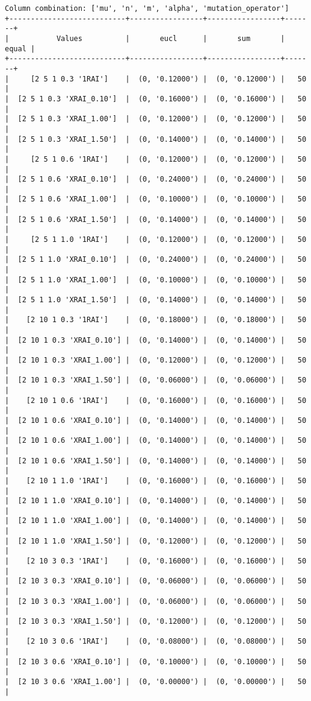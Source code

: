 \documentclass{article}
\begin{document}
\begin{verbatim}
Column combination: ['mu', 'n', 'm', 'alpha', 'mutation_operator']
+---------------------------+-----------------+-----------------+-------+
|           Values          |       eucl      |       sum       | equal |
+---------------------------+-----------------+-----------------+-------+
|     [2 5 1 0.3 '1RAI']    |  (0, '0.12000') |  (0, '0.12000') |   50  |
|  [2 5 1 0.3 'XRAI_0.10']  |  (0, '0.16000') |  (0, '0.16000') |   50  |
|  [2 5 1 0.3 'XRAI_1.00']  |  (0, '0.12000') |  (0, '0.12000') |   50  |
|  [2 5 1 0.3 'XRAI_1.50']  |  (0, '0.14000') |  (0, '0.14000') |   50  |
|     [2 5 1 0.6 '1RAI']    |  (0, '0.12000') |  (0, '0.12000') |   50  |
|  [2 5 1 0.6 'XRAI_0.10']  |  (0, '0.24000') |  (0, '0.24000') |   50  |
|  [2 5 1 0.6 'XRAI_1.00']  |  (0, '0.10000') |  (0, '0.10000') |   50  |
|  [2 5 1 0.6 'XRAI_1.50']  |  (0, '0.14000') |  (0, '0.14000') |   50  |
|     [2 5 1 1.0 '1RAI']    |  (0, '0.12000') |  (0, '0.12000') |   50  |
|  [2 5 1 1.0 'XRAI_0.10']  |  (0, '0.24000') |  (0, '0.24000') |   50  |
|  [2 5 1 1.0 'XRAI_1.00']  |  (0, '0.10000') |  (0, '0.10000') |   50  |
|  [2 5 1 1.0 'XRAI_1.50']  |  (0, '0.14000') |  (0, '0.14000') |   50  |
|    [2 10 1 0.3 '1RAI']    |  (0, '0.18000') |  (0, '0.18000') |   50  |
|  [2 10 1 0.3 'XRAI_0.10'] |  (0, '0.14000') |  (0, '0.14000') |   50  |
|  [2 10 1 0.3 'XRAI_1.00'] |  (0, '0.12000') |  (0, '0.12000') |   50  |
|  [2 10 1 0.3 'XRAI_1.50'] |  (0, '0.06000') |  (0, '0.06000') |   50  |
|    [2 10 1 0.6 '1RAI']    |  (0, '0.16000') |  (0, '0.16000') |   50  |
|  [2 10 1 0.6 'XRAI_0.10'] |  (0, '0.14000') |  (0, '0.14000') |   50  |
|  [2 10 1 0.6 'XRAI_1.00'] |  (0, '0.14000') |  (0, '0.14000') |   50  |
|  [2 10 1 0.6 'XRAI_1.50'] |  (0, '0.14000') |  (0, '0.14000') |   50  |
|    [2 10 1 1.0 '1RAI']    |  (0, '0.16000') |  (0, '0.16000') |   50  |
|  [2 10 1 1.0 'XRAI_0.10'] |  (0, '0.14000') |  (0, '0.14000') |   50  |
|  [2 10 1 1.0 'XRAI_1.00'] |  (0, '0.14000') |  (0, '0.14000') |   50  |
|  [2 10 1 1.0 'XRAI_1.50'] |  (0, '0.12000') |  (0, '0.12000') |   50  |
|    [2 10 3 0.3 '1RAI']    |  (0, '0.16000') |  (0, '0.16000') |   50  |
|  [2 10 3 0.3 'XRAI_0.10'] |  (0, '0.06000') |  (0, '0.06000') |   50  |
|  [2 10 3 0.3 'XRAI_1.00'] |  (0, '0.06000') |  (0, '0.06000') |   50  |
|  [2 10 3 0.3 'XRAI_1.50'] |  (0, '0.12000') |  (0, '0.12000') |   50  |
|    [2 10 3 0.6 '1RAI']    |  (0, '0.08000') |  (0, '0.08000') |   50  |
|  [2 10 3 0.6 'XRAI_0.10'] |  (0, '0.10000') |  (0, '0.10000') |   50  |
|  [2 10 3 0.6 'XRAI_1.00'] |  (0, '0.00000') |  (0, '0.00000') |   50  |

\end{verbatim}
\end{document}
